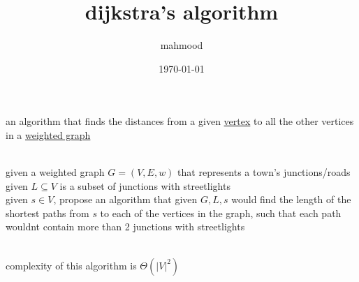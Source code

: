 \documentclass[a4paper,12pt]{article}
\author{mahmood}
\date{\today}
\title{dijkstra's algorithm}
\begin{document}
\maketitle
an algorithm that finds the distances from a given \href{20230314001626-vertex.org}{vertex} to all the other vertices in a \href{20230412150436-weighted_graph.org}{weighted graph}\\
\\

\begin{my_example}
given a weighted graph \(G=(V,E,w)\) that represents a town's junctions/roads\\
given \(L \subseteq V\) is a subset of junctions with streetlights\\
given \(s \in V\), propose an algorithm that given \(G,L,s\) would find the length of the shortest paths from \(s\) to each of the vertices in the graph, such that each path wouldnt contain more than 2 junctions with streetlights\\
\begin{answer}
\\

complexity of this algorithm is \(\Theta(|V|^2)\)\\
\end{answer}
\end{my_example}
\end{document}

